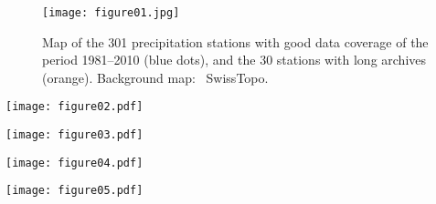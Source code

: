 \documentclass[smallextended]{svjour3}       %
\begin{document}
	
	\clearpage
	
	

	
	\begin{figure}
		\texttt{[image: figure01.jpg]}\\
		\caption{Map of the 301 precipitation stations with good data coverage of the period 1981--2010 (blue dots), and the 30 stations with long archives (orange). Background map: \textcopyright\ SwissTopo.}
		\label{fig:stations}
	\end{figure}
	
	\begin{figure*}
		\texttt{[image: figure02.pdf]}\\
		\caption{CRPSS scores for all stations, and for all considered AMs and reanalysis datasets on the VP. A higher CRPSS score means better performance. The parameters of the AMs were calibrated for every station, every dataset, and every method. The boxes show the 25th, 50th, and 75th percentiles. The whiskers extend to the most extreme data point which is no more than 1.5 times the interquartile range.}
		\label{fig:comparison_values}
	\end{figure*}
	
	\begin{figure*}
		\texttt{[image: figure03.pdf]}\\
		\caption{Impact of the reanalysis dataset on performance, isolated by processing the improvement in CRPSS for one dataset compared to the mean performance on all datasets, per station and per method. Note that the methods cannot be compared here, only the datasets. Same conventions as Fig. \ref{fig:comparison_values}.}
		\label{fig:comparison_relative}
	\end{figure*}
	
	\begin{figure*}
		\texttt{[image: figure04.pdf]}\\
		\caption{Inter-annual correlation between the mean precipitation from the selected analogues and the observations for all stations and for all considered AMs and reanalysis datasets on both the CP and the VP. Same conventions as Fig. \ref{fig:comparison_values}.}
		\label{fig:correlation}
	\end{figure*}
	
	\begin{figure*}
		\texttt{[image: figure05.pdf]}\\
		\caption{Same as Fig. \ref{fig:correlation}, but for relative biases.}
		\label{fig:biases}
	\end{figure*}
	
\end{document}
